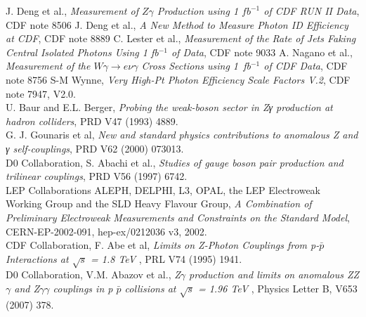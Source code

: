 \documentclass[12pt,twoside,letterpaper]{article}
\begin{document}
   \begin{thebibliography}{99}

     J. Deng et al., \emph{Measurement of $Z\gamma$ Production using 1 $fb^{-1}$ of CDF RUN II Data}, CDF note 8506
     J. Deng et al., \emph{A New Method to Measure Photon ID Efficiency at CDF}, CDF note 8889
     C. Lester et al., \emph{Measurement of the Rate of Jets Faking Central Isolated Photons Using 1 fb$^{-1}$ of Data}, CDF note 9033 
     A. Nagano et al., \emph{Measurement of the $W\gamma \to e \nu \gamma$ Cross Sections using 1~fb$^{-1}$ of CDF Data}, CDF note 8756
     S-M Wynne, \emph{Very High-Pt Photon Efficiency Scale Factors V.2}, CDF note 7947, V2.0. \\
     U. Baur and E.L. Berger, \emph{Probing the weak-boson sector in Zγ production at hadron colliders},
    PRD V47 (1993) 4889. \\
     G. J. Gounaris et al, \emph{New and standard physics contributions to anomalous Z and γ self-couplings},
    PRD V62 (2000) 073013.\\
     D0 Collaboration, S. Abachi et al., \emph{Studies of gauge boson pair production and trilinear couplings}, PRD V56 (1997) 6742. \\
  LEP Collaborations ALEPH, DELPHI, L3, OPAL, the LEP Electroweak Working Group and the SLD Heavy Flavour Group, \emph{A Combination of Preliminary Electroweak Measurements and Constraints on the Standard Model}, CERN-EP-2002-091, hep-ex/0212036 v3, 2002. \\
 CDF Collaboration, F. Abe et al, \emph{Limits on Z-Photon Couplings from p-$\bar{p}$ Interactions at $\sqrt{s}$ = 1.8 TeV }, PRL V74 (1995) 1941. \\
 D0 Collaboration, V.M. Abazov et al., \emph{Z$\gamma$ production and limits on anomalous ZZ$\gamma$ and Z$\gamma\gamma$ couplings in p $\bar{p}$ collisions at   $\sqrt{s}$ = 1.96 TeV }, Physics Letter B, V653 (2007) 378.


   \end{thebibliography}



%
%
%
\end{document}
